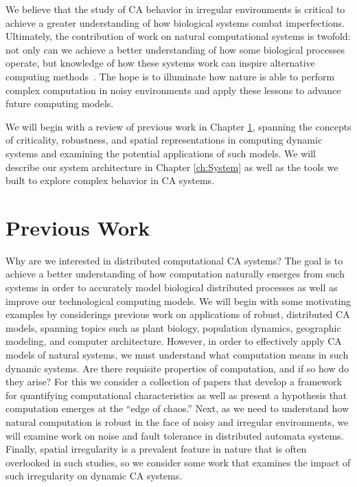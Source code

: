 \documentclass[a4paper,11pt,twoside]{report}
\begin{document}
We believe that the study of CA behavior in irregular environments is critical to achieve a greater understanding of how biological systems combat imperfections. Ultimately, the contribution of work on natural computational systems is twofold: not only can we achieve a better understanding of how some biological processes operate, but knowledge of how these systems work can inspire alternative computing methods~\cite{ma96, si04}. The hope is to illuminate how nature is able to perform complex computation in noisy environments and apply these lessons to advance future computing models.

We will begin with a review of previous work in Chapter \ref{ch:Prev}, spanning the concepts of criticality, robustness, and spatial representations in computing dynamic systems and examining the potential applications of such models. We will describe our system architecture in Chapter \ref{ch:System} as well as the tools we built to explore complex behavior in CA systems.

\chapter{Previous Work}
\label{ch:Prev}

Why are we interested in distributed computational CA systems? The goal is to achieve a better understanding of how computation naturally emerges from such systems in order to accurately model biological distributed processes as well as improve our technological computing models. We will begin with some motivating examples by considerings previous work on applications of robust, distributed CA models, spanning topics such as plant biology, population dynamics, geographic modeling, and computer architecture. However, in order to effectively apply CA models of natural systems, we must understand what computation means in such dynamic systems. Are there requisite properties of computation, and if so how do they arise? For this we consider a collection of papers that develop a framework for quantifying computational characteristics as well as present a hypothesis that computation emerges at the ``edge of chaos.'' Next, as we need to understand how natural computation is robust in the face of noisy and irregular environments, we will examine work on noise and fault tolerance in distributed automata systems. Finally, spatial irregularity is a prevalent feature in nature that is often overlooked in such studies, so we consider some work that examines the impact of such irregularity on dynamic CA systems.
\end{document}
